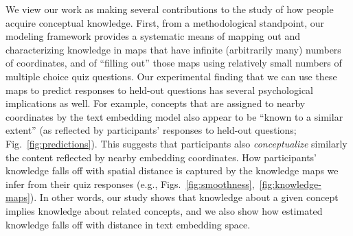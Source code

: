 \documentclass[10pt]{article}
\begin{document}
We view our work as making several contributions to the study of how people
acquire conceptual knowledge. First, from a methodological standpoint, our
modeling framework provides a systematic means of mapping out and
characterizing knowledge in maps that have infinite (arbitrarily many) numbers
of coordinates, and of ``filling out'' those maps using relatively small
numbers of multiple choice quiz questions. Our experimental finding that we can
use these maps to predict responses to held-out questions has several
psychological implications as well. For example, concepts that are assigned to
nearby coordinates by the text embedding model also appear to be ``known to a
similar extent'' (as reflected by participants' responses to held-out
questions; Fig.~\ref{fig:predictions}). This suggests that participants also
\textit{conceptualize} similarly the content reflected by nearby embedding
coordinates. How participants' knowledge falls off with spatial distance is
captured by the knowledge maps we infer from their quiz responses
(e.g., Figs.~\ref{fig:smoothness},~\ref{fig:knowledge-maps}). In other words,
our study shows that knowledge about a given concept implies knowledge about
related concepts, and we also show how estimated knowledge falls off with
distance in text embedding space.
\end{document}
